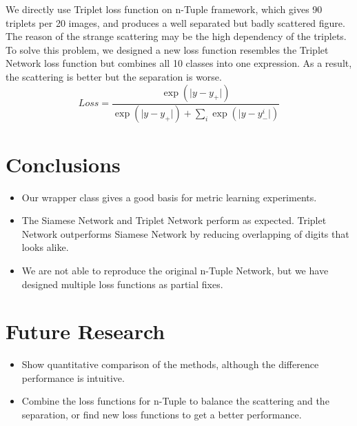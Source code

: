 \documentclass[a0,portrait]{a0poster}
\begin{document}
\begin{multicols}{2}
		We directly use Triplet loss function on n-Tuple framework, which gives 90 triplets per 20 images, and produces a well separated but badly scattered figure. The reason of the strange scattering may be the high dependency of the triplets. To solve this problem, we designed a new loss function resembles the Triplet Network loss function but combines all 10 classes into one expression. As a result, the scattering is better but the separation is worse.
		\begin{equation}
		Loss = \frac{\exp{(\lvert y-y_+ \rvert)}}{\exp{(\lvert y-y_+ \rvert)} + \sum_i\exp{(\lvert y-y_-^i \rvert)}}
		\end{equation}
		
		\color{SaddleBrown} %
		
		\section*{Conclusions}
		
		\begin{itemize}
			\item Our wrapper class gives a good basis for metric learning experiments.
			\item The Siamese Network and Triplet Network perform as expected. Triplet Network outperforms Siamese Network by reducing overlapping of digits that looks alike.
			\item We are not able to reproduce the original n-Tuple Network, but we have designed multiple loss functions as partial fixes.
		\end{itemize}
		
		\color{DarkSlateGray} %
		
		
		\section*{Future Research}
		
		\begin{itemize}
			\item Show quantitative comparison of the methods, although the difference performance is intuitive.
			\item Combine the loss functions for n-Tuple to balance the scattering and the separation, or find new loss functions to get a better performance.
		\end{itemize}
		
	\end{multicols}
\end{document}
